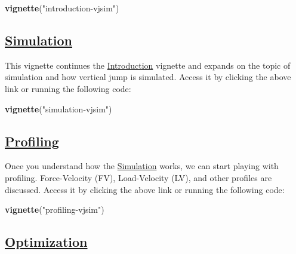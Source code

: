 \documentclass[
]{book}
\newenvironment{Shaded}{\begin{snugshade}}{\end{snugshade}}
\newcommand{\KeywordTok}[1]{\textcolor[rgb]{0.13,0.29,0.53}{\textbf{#1}}}
\newcommand{\NormalTok}[1]{#1}
\newcommand{\StringTok}[1]{\textcolor[rgb]{0.31,0.60,0.02}{#1}}
\begin{document}
\begin{Shaded}
\begin{Highlighting}[]
\KeywordTok{vignette}\NormalTok{(}\StringTok{"introduction{-}vjsim"}\NormalTok{)}
\end{Highlighting}
\end{Shaded}

\hypertarget{simulation}{%
\subsection{\texorpdfstring{\href{https://mladenjovanovic.github.io/vjsim/articles/simulation-vjsim.html}{Simulation}}{Simulation}}\label{simulation}}

This vignette continues the \href{https://mladenjovanovic.github.io/vjsim/articles/introduction-vjsim.html}{Introduction} vignette and expands on the topic of simulation and how vertical jump is simulated. Access it by clicking the above link or running the following code:

\begin{Shaded}
\begin{Highlighting}[]
\KeywordTok{vignette}\NormalTok{(}\StringTok{"simulation{-}vjsim"}\NormalTok{)}
\end{Highlighting}
\end{Shaded}

\hypertarget{profiling}{%
\subsection{\texorpdfstring{\href{https://mladenjovanovic.github.io/vjsim/articles/profiling-vjsim.html}{Profiling}}{Profiling}}\label{profiling}}

Once you understand how the \href{https://mladenjovanovic.github.io/vjsim/articles/simulation-vjsim.html}{Simulation} works, we can start playing with profiling. Force-Velocity (FV), Load-Velocity (LV), and other profiles are discussed. Access it by clicking the above link or running the following code:

\begin{Shaded}
\begin{Highlighting}[]
\KeywordTok{vignette}\NormalTok{(}\StringTok{"profiling{-}vjsim"}\NormalTok{)}
\end{Highlighting}
\end{Shaded}

\hypertarget{optimization}{%
\subsection{\texorpdfstring{\href{https://mladenjovanovic.github.io/vjsim/articles/optimization-vjsim.html}{Optimization}}{Optimization}}\label{optimization}}
\end{document}

